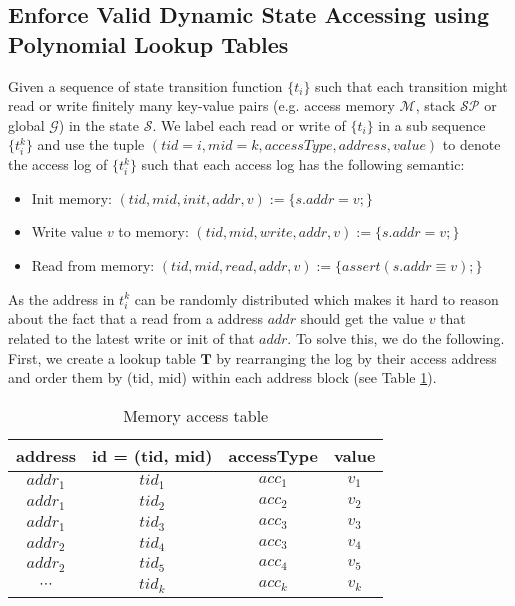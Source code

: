 \subsection{Enforce Valid Dynamic State Accessing using Polynomial Lookup Tables}
Given a sequence of state transition function $\{t_i\}$ such that each transition might read or write finitely many key-value pairs (e.g. access memory $\mathcal{M}$, stack $\mathcal{SP}$ or global $\mathcal{G}$) in the state $\mathcal{S}$. We label each read or write of $\{t_i\}$ in a sub sequence $\{t_i^k\}$ and use the tuple $(tid=i, mid=k, accessType, address, value)$ to denote the access log of $\{t_i^k\}$ such that each access log has the following semantic:
\begin{itemize}
    \item Init memory: $(tid, mid, init, addr, v ) := \{ s.addr = v; \}$
    \item Write value $v$ to memory: $(tid, mid, write, addr, v) := \{ s.addr = v; \}$
    \item Read from memory: $(tid, mid, read, addr, v) := \{assert(s.addr \equiv v);\}$
\end{itemize}

As the address in $t_i^k$ can be randomly distributed which makes it hard to reason about the fact that a read from a address $addr$ should get the value $v$ that related to the latest write or init of that $addr$. To solve this, we do the following. First, we create a lookup table $\mathbf{T}$ by rearranging the log by their access address and order them by (tid, mid) within each address block (see Table \ref{tbl:rw-table}).
\begin{table}[!h]
\begin{center}
\caption{Memory access table}
\label{tbl:rw-table}
\begin{tabular}{ | c | c | c | c | }
  \hline
  address & id = (tid, mid) & accessType & value \\ 
  \hline
 $addr_1$ & $tid_1$ &  $acc_1$ & $v_1$ \\  
 $addr_1$ & $tid_2$ &  $acc_2$ & $v_2$ \\
  $addr_1$ & $tid_3$ &  $acc_3$ & $v_3$ \\  
 \hline
 $addr_2$ & $tid_4$ &  $acc_3$ & $v_4$ \\  
 $addr_2$ & $tid_5$ & $acc_4$ & $v_5$ \\
 \hline
 $\cdots$ & $tid_k$ & $acc_k$ & $v_k$ \\
 \hline
\end{tabular}

\end{center}
\end{table}

